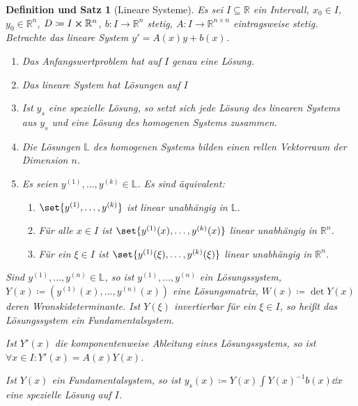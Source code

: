\documentclass[a4paper]{article}
\theoremstyle{marginbreak}
\newtheorem{defsatz}[definition]{Definition und Satz}
\begin{document}
	\begin{defsatz}[Lineare Systeme]
		Es sei $I\subseteq\mathbb{R}$ ein Intervall, $x_0\in I$, $y_0\in\mathbb{R}^n$,
		$D\coloneqq I\cross\mathbb{R}^n$, $b\colon I\to\mathbb{R}^n$ stetig, $A\colon I\to\mathbb{R}^{n\times n}$
		eintragsweise stetig. Betrachte das lineare System $y'= A(x)y + b(x)$.
		\begin{enumerate}[label=(\alph*)]
			\item Das Anfangswertproblem hat auf $I$ genau eine Lösung.
			\item Das lineare System hat Lösungen auf $I$
			\item Ist $y_s$ eine spezielle Lösung, so setzt sich jede Lösung des linearen
				Systems aus $y_s$ und eine Lösung des homogenen Systems zusammen.
			\item Die Lösungen $\mathbb{L}$ des homogenen Systems bilden einen rellen Vektorraum der Dimension $n$.
			\item Es seien $y^{(1)},\ldots,y^{(k)}\in\mathbb{L}$. Es sind äquivalent:
				\begin{enumerate}[label=(\roman*)]
					\item $\set{y^{(1)},\ldots,y^{(k)}}$ ist linear unabhängig in $\mathbb{L}$.
					\item Für alle $x\in I$ ist $\set{y^{(1)}(x),\ldots,y^{(k)}(x)}$ linear unabhängig in $\mathbb{R}^n$.
					\item Für ein $\xi\in I$ ist $\set{y^{(1)}(\xi),\ldots,y^{(k)}(\xi)}$ linear unabhängig in $\mathbb{R}^n$.
				\end{enumerate}
		\end{enumerate}
		Sind $y^{(1)},\ldots,y^{(n)}\in\mathbb{L}$, so ist $y^{(1)},\ldots,y^{(n)}$ ein Lösungssystem,
		$Y(x)\coloneqq(y^{(1)}(x),\dots,y^{(n)}(x))$ eine Lösungsmatrix, $W(x)\coloneqq\det Y(x)$ deren
		Wronskideterminante. Ist $Y(\xi)$ invertierbar für ein $\xi\in I$, so heißt
		das Lösungssystem ein Fundamentalsystem.

		Ist $Y'(x)$ die komponentenweise Ableitung eines Lösungssystems, so ist
		$\forall x\in I\colon Y'(x)=A(x)Y(x)$.

		Ist $Y(x)$ ein Fundamentalsystem, so ist $y_s(x)\coloneqq Y(x)\int Y(x)^{-1}b(x)\dd{x}$
		eine spezielle Lösung auf $I$.
	\end{defsatz}
\end{document}
